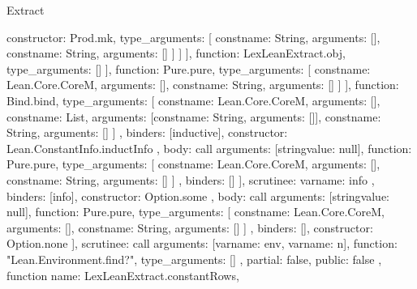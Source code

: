 \begin{lexlean}{Extract}
\begin{toolingmodule}
{{{{{{{{{{{{                                      constructor: Prod.mk,
                                      type_arguments: [
                                        const{name: String, arguments: []},
                                        const{name: String, arguments: []}
                                      ]
                                    }
                                  ]
                                }
                              ],
                              function: LexLeanExtract.obj,
                              type_arguments: []
                            }
                          ],
                          function: Pure.pure,
                          type_arguments: [
                            const{name: Lean.Core.CoreM, arguments: []},
                            const{name: String, arguments: []}
                          ]
                        }
                      }
                    ],
                    function: Bind.bind,
                    type_arguments: [
                      const{name: Lean.Core.CoreM, arguments: []},
                      const{name: List, arguments: [const{name: String, arguments: []}]},
                      const{name: String, arguments: []}
                    ]
                  },
                  binders: [inductive],
                  constructor: Lean.ConstantInfo.inductInfo
                },
                {
                  body: call{
                    arguments: [string{value: null}],
                    function: Pure.pure,
                    type_arguments: [
                      const{name: Lean.Core.CoreM, arguments: []},
                      const{name: String, arguments: []}
                    ]
                  },
                  binders: []
                }
              ],
              scrutinee: var{name: info}
            },
            binders: [info],
            constructor: Option.some
          },
          {
            body: call{
              arguments: [string{value: null}],
              function: Pure.pure,
              type_arguments: [
                const{name: Lean.Core.CoreM, arguments: []},
                const{name: String, arguments: []}
              ]
            },
            binders: [],
            constructor: Option.none
          }
        ],
        scrutinee: call{
          arguments: [var{name: env}, var{name: n}],
          function: "Lean.Environment.find?",
          type_arguments: []
        }
      },
      partial: false,
      public: false
    },
    function{
      name: LexLeanExtract.constantRows,
}}
\end{toolingmodule}
\end{lexlean}
